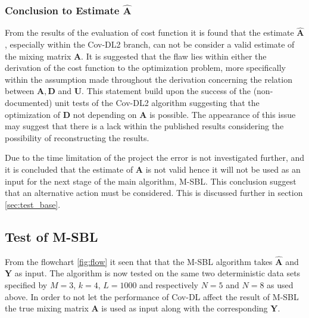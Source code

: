 \subsubsection{Conclusion to Estimate $\hat{\mathbf{A}}$}
From the results of the evaluation of cost function it is found that the estimate $\hat{\mathbf{A}}$, especially within the Cov-DL2 branch, can not be consider a valid estimate of the mixing matrix $\mathbf{A}$. 
It is suggested that the flaw lies within either the  derivation of the cost function to the optimization problem, more specifically within the assumption made throughout the derivation concerning the relation between $\mathbf{A}, \mathbf{D}$ and $\mathbf{U}$. 
This statement build upon the success of the (non-documented) unit tests of the Cov-DL2 algorithm suggesting that the optimization of $\mathbf{D}$ not depending on $\mathbf{A}$ is possible.
The appearance of this issue may suggest that there is a lack within the published results \cite{Balkan2015} considering the possibility of reconstructing the results.  

Due to the time limitation of the project the error is not investigated further, and it is concluded that the estimate of $\mathbf{A}$ is not valid hence it will not be used as an input for the next stage of the main algorithm, M-SBL. This conclusion suggest that an alternative action must be considered. This is discussed further in section \ref{sec:test_base}.

\subsection{Test of M-SBL}
From the flowchart \ref{fig:flow} it seen that that the M-SBL algorithm takes $\hat{\mathbf{A}}$ and $\mathbf{Y}$ as input. 
The algorithm is now tested on the same two deterministic data sets specified by $M = 3$, $k = 4$, $L=1000$ and respectively $N = 5$ and $N = 8$ as used above. 
In order to not let the performance of Cov-DL affect the result of M-SBL the true mixing matrix $\mathbf{A}$ is used  as input along with the corresponding $\mathbf{Y}$. 

